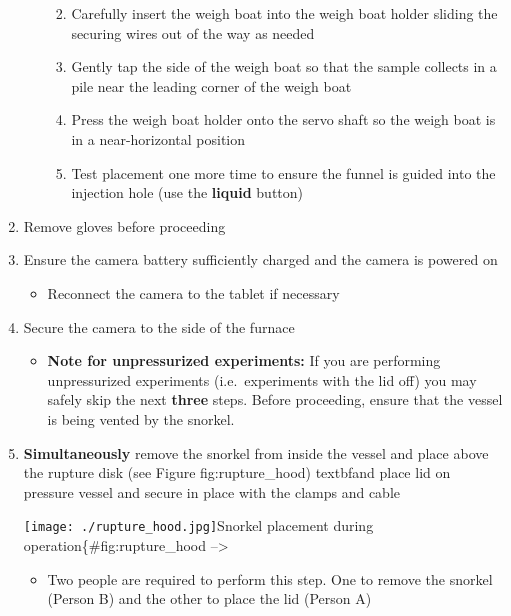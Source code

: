 \begin{enumerate}
\begin{itemize}
    \begin{enumerate}
    \def\labelenumii{\arabic{enumii}.}
    \tightlist
    \item
      Carefully insert the weigh boat into the weigh boat holder sliding
      the securing wires out of the way as needed
    \item
      Gently tap the side of the weigh boat so that the sample collects
      in a pile near the leading corner of the weigh boat
    \item
      Press the weigh boat holder onto the servo shaft so the weigh boat
      is in a near-horizontal position
    \item
      Test placement one more time to ensure the funnel is guided into
      the injection hole (use the \textbf{liquid} button)
    \end{enumerate}
  \end{itemize}
\item
  Remove gloves before proceeding
\item
  Ensure the camera battery sufficiently charged and the camera is
  powered on

  \begin{itemize}
  \tightlist
  \item
    Reconnect the camera to the tablet if necessary
  \end{itemize}
\item
  Secure the camera to the side of the furnace

  \begin{itemize}
  \tightlist
  \item
    \textbf{Note for unpressurized experiments:} If you are performing
    unpressurized experiments (i.e.~experiments with the lid off) you
    may safely skip the next \textbf{three} steps. Before proceeding,
    ensure that the vessel is being vented by the snorkel.
  \end{itemize}
\item
  \textbf{Simultaneously} remove the snorkel from inside the vessel and
  place above the rupture disk (see Figure fig:rupture\_hood) textbfand
  place lid on pressure vessel and secure in place with the clamps and
  cable

  \texttt{[image: ./rupture\_hood.jpg]}Snorkel placement during
  operation\{\#fig:rupture\_hood --\textgreater{}

  \begin{itemize}
  \tightlist
  \item
    Two people are required to perform this step. One to remove the
    snorkel (Person B) and the other to place the lid (Person A)
  \end{itemize}


\end{enumerate}
